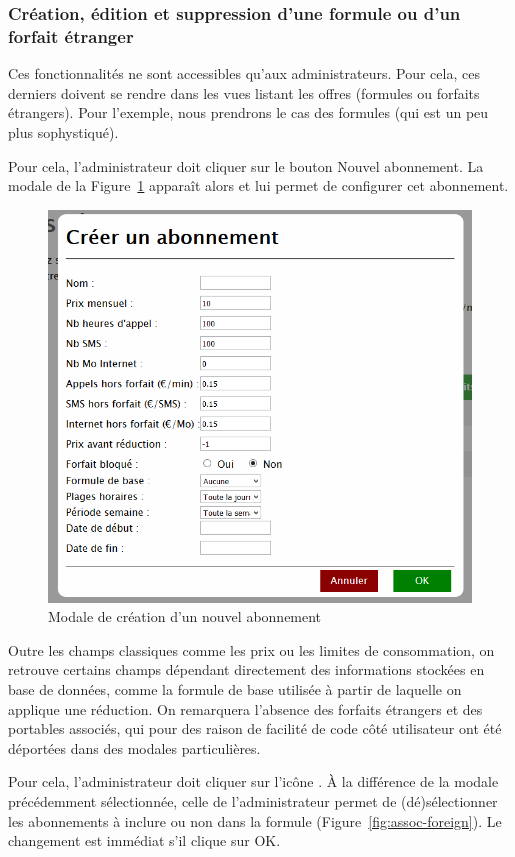 \subsubsection{Création, édition et suppression d'une formule ou d'un forfait étranger}
Ces fonctionnalités ne sont accessibles qu'aux administrateurs. Pour cela, ces derniers doivent se rendre dans les vues listant les offres (formules ou forfaits étrangers). Pour l'exemple, nous prendrons le cas des formules (qui est un peu plus sophystiqué).

Pour cela, l'administrateur doit cliquer sur le bouton \og Nouvel abonnement\fg. La modale de la Figure~\ref{fig:nouvel-abonnement} apparaît alors et lui permet de configurer cet abonnement.

\begin{figure}[ht]
  \centering
  \includegraphics[width=.7\textwidth]{images/Plateforme/nouvel-abonnement}
  \caption{Modale de création d'un nouvel abonnement}
  \label{fig:nouvel-abonnement}
\end{figure}

Outre les champs classiques comme les prix ou les limites de consommation, on retrouve certains champs dépendant directement des informations stockées en base de données, comme la formule de base utilisée à partir de laquelle on applique une réduction. On remarquera l'absence des forfaits étrangers et des portables associés, qui pour des raison de facilité de code côté utilisateur ont été déportées dans des modales particulières.

Pour cela, l'administrateur doit cliquer sur l'icône \faGlobe. À la différence de la modale précédemment sélectionnée, celle de l'administrateur permet de (dé)sélectionner les abonnements à inclure ou non dans la formule (Figure~\ref{fig:assoc-foreign}). Le changement est immédiat s'il clique sur \og OK\fg.


